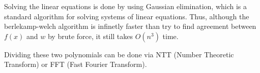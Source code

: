Solving the linear equations is done by using Gaussian elimination,
which is a standard algorithm for solving systems of linear equations.
Thus, although the berlekamp-welch algorithm is infinetly faster than try to find agreement 
between $f(x)$ and $w$ by brute force, it still takes $O(n^3)$ time. 

Dividing these two polynomials can be done via NTT (Number Theoretic Transform) or FFT (Fast Fourier Transform).